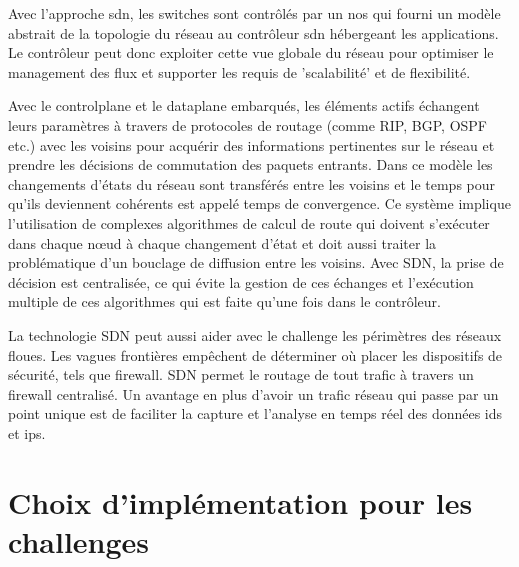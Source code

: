 Avec l'approche \gls{sdn}, les switches sont contrôlés par un \gls{nos} qui fourni un modèle abstrait de la topologie du réseau au contrôleur \gls{sdn} hébergeant les applications. Le contrôleur peut donc exploiter cette vue globale du réseau pour optimiser le management des flux et supporter les requis de 'scalabilité' et de flexibilité. \cite{WhySDN}

Avec le \gls{controlplane} et le \gls{dataplane} embarqués, les éléments actifs échangent leurs paramètres à travers de protocoles de routage (comme RIP, BGP, OSPF etc.) avec les voisins pour acquérir des informations pertinentes sur le réseau et prendre les décisions de commutation des paquets entrants. Dans ce modèle les changements d'états du réseau sont transférés entre les voisins et le temps pour qu'ils deviennent cohérents est appelé temps de convergence. Ce système implique l'utilisation de complexes algorithmes de calcul de route qui doivent s'exécuter dans chaque nœud à chaque changement d'état et doit aussi traiter la problématique d'un bouclage de diffusion entre les voisins. Avec SDN, la prise de décision est centralisée, ce qui évite la gestion de ces échanges et l'exécution multiple de ces algorithmes qui est faite qu'une fois dans le contrôleur. \cite{sdnbookControlDataPlanes}



La technologie SDN peut aussi aider avec le challenge les périmètres des réseaux floues. Les vagues frontières empêchent de déterminer où placer les dispositifs de sécurité, tels que firewall. SDN permet le routage de tout trafic à travers un firewall centralisé. Un avantage en plus d'avoir un trafic réseau qui passe par un point unique est de faciliter la capture et l'analyse en temps réel des données \gls{ids} et \gls{ips}.

\section{Choix d'implémentation pour les challenges}


